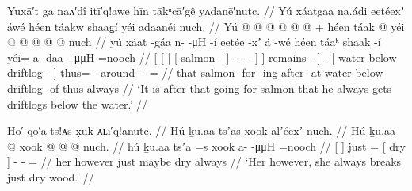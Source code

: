 \ex\label{ex:89-23-go-for-wet-wood}%
%
\begingl
	\glpreamble	Yuxā′t g̣a naᴀ′dî itī′q!awe hīn tākᵘcā′gê yᴀdanē′nutc. //
	\glpreamble	Yú x̱áatg̱aa na.ádi eetéexʼ áwé héen táakw shaag̱í yéi adaanéi nuch. //
	\gla	{} {} Yú {} {}  @ {} {}
				 @ {} @ {} @ {} {} {}
			 @ {} {} 
		 @ {} +
		{} héen táak  @ {} {}
		yéi @  @ {} @ {} @ {} @ \•nuch //
	\glb	{} {} yú {} {} x̱áat -g̱áa {} n-  -μH -í {} {} eetée -xʼ {}
		á -wé
		{} héen táaᵏ shaaḵ -í {}
		yéi= a- daa-  -μμH =nooch //
	\glc	{}[ {}[  {}[ {}[ salmon - {}]
				-  - - {}] {}]
			remains - {}]
		 -
		{}[ water below driftlog - {}]
		thus= - around-  - = //
	\gld	{} {} that {} {} salmon -for {}
				 {} {} -ing {} {}
			after -at {}
		 {}
		{} water below driftlog -of {}
		thus  {} {} {} \•always //
	\glft	‘It is after that going for salmon that he always gets driftlogs below the water.’
		//
\endgl
\xe

\ex\label{ex:89-24-break-dry-wood}%
%
\begingl
	\glpreamble	Ho′ qo′a ts!ᴀs x̣ūk ᴀʟī′q!anutc. //
	\glpreamble	Hú ḵu.aa tsʼas xook alʼéexʼ nuch. //
	\gla	{} Hú {} ḵu.aa  @ {}
		{} xook {} 
		 @ {} @ {} @ \•nuch. //
	\glb	{} hú {} ḵu.aa tsʼa =s
		{} xook {}
		a-  -μμH\hspace{1.25em} =nooch //
	\glc	{}[  {}]  just =
		{}[ dry {}]
		-  - = //
	\gld	{} her {} however just \•maybe
		{} dry {}
		 {} {} \•always //
	\glft	‘Her however, she always breaks just dry wood.’
		//
\endgl
\xe

